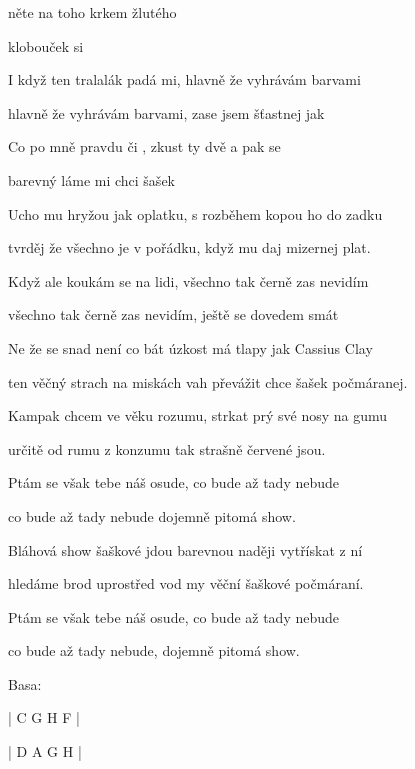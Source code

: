 

\zs
    něte na toho   krkem žlutého 					

     klobouček   si   		
\ks

\zs
    I když ten tralalák padá mi, hlavně že vyhrávám barvami

    hlavně že vyhrávám barvami, zase jsem šťastnej jak 
\ks

\zr
    Co po mně  pravdu či , zkust ty dvě  a pak se 

    barevný  láme mi   chci  šašek 
\kr

\zs
    Ucho mu hryžou jak oplatku, s rozběhem kopou ho do zadku

    tvrděj že všechno je v pořádku, když mu daj mizernej plat.
\ks

\zs
    Když ale koukám se na lidi, všechno tak černě zas nevidím

    všechno tak černě zas nevidím, ještě se dovedem smát
\ks

\zr
    Ne že se snad není co bát úzkost má tlapy jak Cassius Clay

    ten věčný strach na miskách vah převážit chce šašek počmáranej.
\kr

\zs
    Kampak chcem ve věku rozumu, strkat prý své nosy na gumu

    určitě od rumu z konzumu tak strašně červené jsou.
\ks

\zs
    Ptám se však tebe náš osude, co bude až tady nebude

    co bude až tady nebude dojemně pitomá show.
\ks

\zr
    Bláhová show šaškové jdou barevnou naději vytřískat z ní

    hledáme brod uprostřed vod my věční šaškové počmáraní.
\kr

\zs
    Ptám se však tebe náš osude, co bude až tady nebude

    co bude až tady nebude, dojemně pitomá show.
\ks

\ifdefined\TPBAND
    Basa:
    
    | C G H F |
    
    | D A G H |
    
